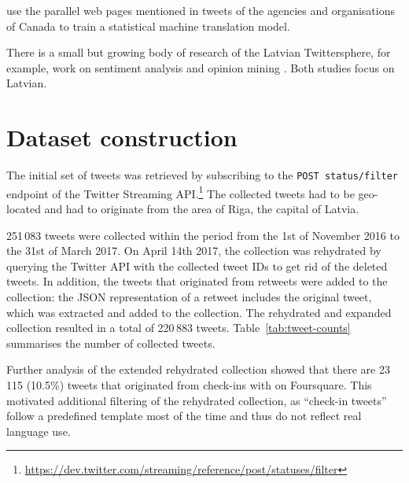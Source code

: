 \documentclass[11pt,a4paper]{article}
\begin{document}
\citet{gotti-langlais-farzindar:2013:LASM} use the parallel web pages mentioned in tweets of the agencies and organisations of Canada to train a statistical machine translation model.

There is a small but growing body of research of the Latvian Twittersphere, for example, work on sentiment analysis \cite{Peisenieks2014} and opinion mining \cite{vspats2016opinion}. Both studies focus on Latvian.

\section{Dataset construction}
\label{sec:construction}

The initial set of tweets was retrieved by subscribing to the \texttt{POST status/filter} endpoint of the Twitter Streaming API.\footnote{\url{https://dev.twitter.com/streaming/reference/post/statuses/filter}}
The collected tweets had to be geo-located and had to originate from the area of Riga, the capital of Latvia.\footnotemark{}



251\,083 tweets were collected within the period from the 1st of November 2016 to the 31st of March 2017. On April 14th 2017, the collection was rehydrated by querying the Twitter API with the collected tweet IDs to get rid of the deleted tweets. In addition, the tweets that originated from retweets were added to the collection: the JSON representation of a retweet includes the original tweet, which was extracted and added to the collection. The rehydrated and expanded collection resulted in a total of 220\,883 tweets. Table~\ref{tab:tweet-counts} summarises the number of collected tweets.



Further analysis of the extended rehydrated collection showed that there are 23\,115 (10.5\%) tweets that originated from check-ins with on Foursquare.%
This motivated additional filtering of the rehydrated collection, as ``check-in tweets'' follow a predefined template most of the time and thus do not reflect real language use. %
\end{document}
